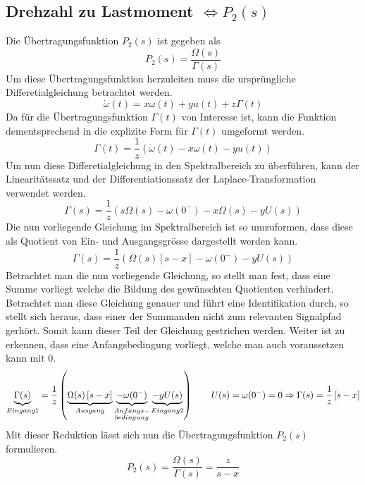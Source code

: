 \subsection{Drehzahl zu Lastmoment $\Leftrightarrow P_2(s)$}
Die Übertragungsfunktion $P_2(s)$ ist gegeben als
\[
	P_2(s) = \frac{\Omega(s)}{\Gamma(s)}
\]
Um diese Übertragungsfunktion herzuleiten muss die ursprüngliche
Differetialgleichung betrachtet werden.
\[
	\dot\omega(t) = x \omega(t) + y u(t) + z \Gamma(t)
\]
Da für die Übertragungsfunktion $\Gamma(t)$ von Interesse ist, kann die
Funktion dementsprechend in die explizite Form für $\Gamma(t)$ umgeformt
werden.
\[
	\Gamma(t) = \frac{1}{z} \left(
			\dot\omega(t) - x \omega(t) - y u(t)
		\right)
\]
Um nun diese Differetialgleichung in den Spektralbereich zu überführen, kann
der Linearitätssatz und der Differentiationssatz der Laplace-Transformation
verwendet werden.
\[
	\Gamma(s) = \frac{1}{z} \left(
			s \Omega(s) - \omega(0^-) - x \Omega(s) - y U(s)
		\right)
\]
Die nun vorliegende Gleichung im Spektralbereich ist so umzuformen, dass diese
als Quotient von Ein- und Ausgangsgrösse dargestellt werden kann.
\[
	\Gamma(s) = \frac{1}{z} \left(
			\Omega(s) \left[ s-x \right] - \omega(0^-) - y U(s)
		\right)
\]
Betrachtet man die nun vorliegende Gleichung, so stellt man fest, dass eine
Summe vorliegt welche die Bildung des gewünschten Quotienten verhindert.
Betrachtet man diese Gleichung genauer und führt eine Identifikation durch, so
stellt sich heraus, dass einer der Summanden nicht zum relevanten Signalpfad
gerhört. Somit kann dieser Teil der Gleichung gestrichen werden. Weiter ist
zu erkennen, dass eine Anfangsbedingung vorliegt, welche man auch voraussetzen
kann mit 0.
\[
	\underbrace{\Gamma(s)}_{Eingang 1} = \frac{1}{z} \left(
			\underbrace{\Omega(s) \left[ s-x \right]}_{Ausgang}
			\underbrace{- \omega(0^-)}_{\begin{subarray}{c}Anfangs-\\ bedingung\end{subarray}}
			\underbrace{- y U(s)}_{Eingang 2}
		\right)
	\qquad U(s) = \omega(0^-) = 0 \Rightarrow \Gamma(s) =
		\frac{1}{z} \left[ s-x \right]
\]
Mit dieser Reduktion lässt sich nun die Übertragungsfunktion $P_2(s)$
formulieren.
\[
	P_2(s) = \frac{\Omega(s)}{\Gamma(s)} = \frac{z}{s-x}
\]
